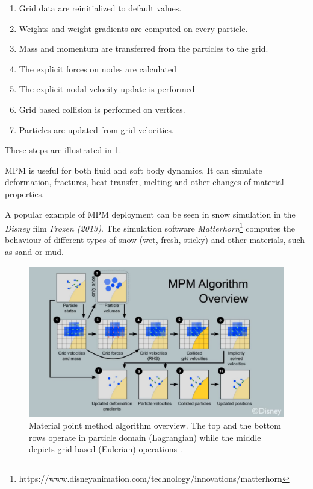 \begin{enumerate}
    \item Grid data are reinitialized to default values.
    \item Weights and weight gradients are computed on every particle.
    \item Mass and momentum are transferred from the particles to the grid.
    \item The explicit forces on nodes are calculated
    \item The explicit nodal velocity update is performed
    \item Grid based collision is performed on vertices.
    \item Particles are updated from grid velocities.
\end{enumerate}
These steps are illustrated in \cref{fig:mpm}.

MPM is useful for both fluid and soft body dynamics. It can simulate deformation, fractures, heat transfer, melting and other changes of material properties.

A popular example of MPM deployment can be seen in snow simulation in the \emph{Disney} film \emph{Frozen (2013)}. The simulation software \emph{Matterhorn}\footnote{https://www.disneyanimation.com/technology/innovations/matterhorn} computes the behaviour of different types of snow (\eg wet, fresh, sticky) and other materials, such as sand or mud.

\begin{figure}
\centering
\includegraphics[width=\textwidth]{img/MPM}
\caption{Material point method algorithm overview. The top and the bottom rows operate in particle domain (Lagrangian) while the middle depicts grid-based (Eulerian) operations \cite{disney}.
}
\label{fig:mpm}
\end{figure}

